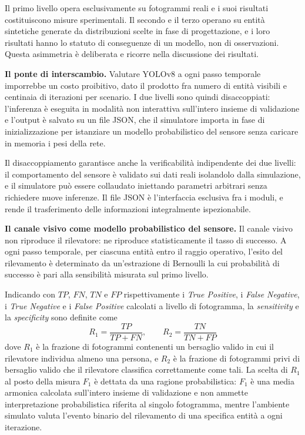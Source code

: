 \documentclass[a4paper,12pt]{report}
\begin{document}
Il primo livello opera esclusivamente su fotogrammi reali e i suoi risultati
costituiscono misure sperimentali. Il secondo e il terzo operano su entità
sintetiche generate da distribuzioni scelte in fase di progettazione, e i loro
risultati hanno lo statuto di conseguenze di un modello, non di osservazioni.
Questa asimmetria è deliberata e ricorre nella discussione dei risultati.

\textbf{Il ponte di interscambio.}
Valutare YOLOv8 a ogni passo temporale imporrebbe un costo proibitivo, dato il
prodotto fra numero di entità visibili e centinaia di iterazioni per scenario. I
due livelli sono quindi disaccoppiati: l'inferenza è eseguita in modalità non
interattiva sull'intero insieme di validazione e l'output è salvato su un file
JSON, che il simulatore importa in fase di inizializzazione per istanziare un
modello probabilistico del sensore senza caricare in memoria i pesi della rete.

Il disaccoppiamento garantisce anche la verificabilità indipendente dei due
livelli: il comportamento del sensore è validato sui dati reali isolandolo dalla
simulazione, e il simulatore può essere collaudato iniettando parametri
arbitrari senza richiedere nuove inferenze. Il file JSON è l'interfaccia
esclusiva fra i moduli, e rende il trasferimento delle informazioni
integralmente ispezionabile.

\textbf{Il canale visivo come modello probabilistico del sensore.}
\label{sec:canale_visivo}
Il canale visivo non riproduce il rilevatore: ne riproduce statisticamente il
tasso di successo. A ogni passo temporale, per ciascuna entità entro il raggio
operativo, l'esito del rilevamento è determinato da un'estrazione di Bernoulli
la cui probabilità di successo è pari alla sensibilità misurata sul primo
livello.

Indicando con $\mathit{TP}$, $\mathit{FN}$, $\mathit{TN}$ e $\mathit{FP}$
rispettivamente i \textit{True Positive}, i \textit{False Negative}, i
\textit{True Negative} e i \textit{False Positive} calcolati a livello di
fotogramma, la \textit{sensitivity} e la \textit{specificity} sono definite come
\begin{equation}
    R_1 = \frac{\mathit{TP}}{\mathit{TP} + \mathit{FN}}, \qquad
    R_2 = \frac{\mathit{TN}}{\mathit{TN} + \mathit{FP}}
    \label{eq:r1_r2}
\end{equation}
dove $R_1$ è la frazione di fotogrammi contenenti un bersaglio valido in cui il
rilevatore individua almeno una persona, e $R_2$ è la frazione di fotogrammi
privi di bersaglio valido che il rilevatore classifica correttamente come tali.
La scelta di $R_1$ al posto della misura $F_1$ è dettata da una ragione
probabilistica: $F_1$ è una media armonica calcolata sull'intero insieme di
validazione e non ammette interpretazione probabilistica riferita al singolo
fotogramma, mentre l'ambiente simulato valuta l'evento binario del rilevamento
di una specifica entità a ogni iterazione.
\end{document}
